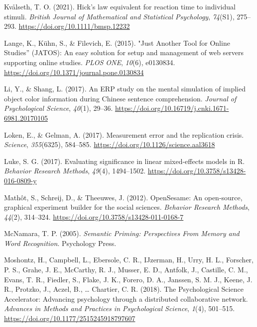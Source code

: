 \documentclass[
  man]{apa7}
\newlength{\cslhangindent}
\newlength{\cslentryspacingunit} %
\newenvironment{CSLReferences}[2] %
 {%
  \setlength{\parindent}{0pt}
  \ifodd #1
  \let\oldpar\par
  \def\par{\hangindent=\cslhangindent\oldpar}
  \fi
  \setlength{\parskip}{#2\cslentryspacingunit}
 }%
 {}
\begin{document}
\begin{CSLReferences}{1}{0}
\leavevmode{}%
Kvålseth, T. O. (2021). Hick's law equivalent for reaction time to individual stimuli. \emph{British Journal of Mathematical and Statistical Psychology}, \emph{74}(S1), 275--293. \url{https://doi.org/10.1111/bmsp.12232}

\leavevmode{}%
Lange, K., Kühn, S., \& Filevich, E. (2015). "{Just Another Tool} for {Online Studies}'' ({JATOS}): {An} easy solution for setup and management of web servers supporting online studies. \emph{PLOS ONE}, \emph{10}(6), e0130834. \url{https://doi.org/10.1371/journal.pone.0130834}

\leavevmode{}%
Li, Y., \& Shang, L. (2017). {An ERP study on the mental simulation of implied object color information during Chinese sentence comprehension}. \emph{Journal of Psychological Science}, \emph{40}(1), 29--36. \url{https://doi.org/10.16719/j.cnki.1671-6981.20170105}

\leavevmode{}%
Loken, E., \& Gelman, A. (2017). Measurement error and the replication crisis. \emph{Science}, \emph{355}(6325), 584--585. \url{https://doi.org/10.1126/science.aal3618}

\leavevmode{}%
Luke, S. G. (2017). Evaluating significance in linear mixed-effects models in {R}. \emph{Behavior Research Methods}, \emph{49}(4), 1494--1502. \url{https://doi.org/10.3758/s13428-016-0809-y}

\leavevmode{}%
Mathôt, S., Schreij, D., \& Theeuwes, J. (2012). {OpenSesame}: {An} open-source, graphical experiment builder for the social sciences. \emph{Behavior Research Methods}, \emph{44}(2), 314--324. \url{https://doi.org/10.3758/s13428-011-0168-7}

\leavevmode{}%
McNamara, T. P. (2005). \emph{Semantic {Priming}: {Perspectives From Memory} and {Word Recognition}}. {Psychology Press}.

\leavevmode{}%
Moshontz, H., Campbell, L., Ebersole, C. R., IJzerman, H., Urry, H. L., Forscher, P. S., Grahe, J. E., McCarthy, R. J., Musser, E. D., Antfolk, J., Castille, C. M., Evans, T. R., Fiedler, S., Flake, J. K., Forero, D. A., Janssen, S. M. J., Keene, J. R., Protzko, J., Aczel, B., \ldots{} Chartier, C. R. (2018). The {Psychological Science Accelerator}: {Advancing} psychology through a distributed collaborative network. \emph{Advances in Methods and Practices in Psychological Science}, \emph{1}(4), 501--515. \url{https://doi.org/10.1177/2515245918797607}


\end{CSLReferences}
\end{document}
